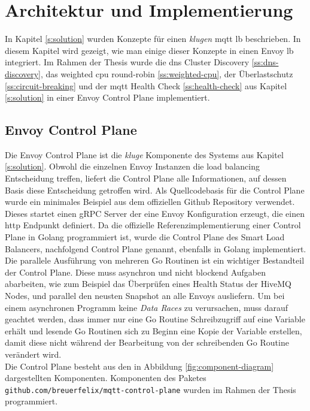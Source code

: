 \section{Architektur und Implementierung}
In Kapitel \ref{s:solution} wurden Konzepte für einen \textit{klugen} \ac{mqtt} \acl{lb} beschrieben. In diesem Kapitel wird gezeigt, wie man einige dieser Konzepte in einen Envoy \acl{lb} integriert.
Im Rahmen der Thesis wurde die \ac{dns} Cluster Discovery \ref{ss:dns-discovery}, das weighted \ac{cpu} round-robin \ref{ss:weighted-cpu}, der Überlastschutz \ref{ss:circuit-breaking} und der \ac{mqtt} Health Check \ref{ss:health-check} aus Kapitel \ref{s:solution} in einer Envoy Control Plane implementiert.

\subsection{Envoy Control Plane} \label{si:control-plane}
Die Envoy Control Plane ist die \textit{kluge} Komponente des Systems aus Kapitel \ref{s:solution}. Obwohl die einzelnen Envoy Instanzen die load balancing Entscheidung treffen, liefert die Control Plane alle Informationen, auf dessen Basis diese Entscheidung getroffen wird.
Als Quellcodebasis für die Control Plane wurde ein minimales Beispiel aus dem offiziellen Github Repository \cite{EnvoyproxyGocontrolplane} verwendet. Dieses startet einen gRPC Server der eine Envoy Konfiguration erzeugt, die einen \ac{http} Endpunkt definiert. Da die offizielle Referenzimplementierung einer Control Plane in Golang programmiert ist, wurde die Control Plane des Smart Load Balancers, nachfolgend Control Plane genannt, ebenfalls in Golang implementiert.
\\
Die parallele Ausführung von mehreren Go Routinen ist ein wichtiger Bestandteil der Control Plane. Diese muss asynchron und nicht blockend Aufgaben abarbeiten, wie zum Beispiel das Überprüfen eines Health Status der HiveMQ Nodes, und parallel den neusten Snapshot an alle Envoys ausliefern.
Um bei einem asynchronen Programm keine \textit{Data Races} zu verursachen, muss darauf geachtet werden, dass immer nur eine Go Routine Schreibzugriff auf eine Variable erhält und lesende Go Routinen sich zu Beginn eine Kopie der Variable erstellen, damit diese nicht während der Bearbeitung von der schreibenden Go Routine verändert wird.
\\
Die Control Plane besteht aus den in Abbildung \ref{fig:component-diagram} dargestellten Komponenten. Komponenten des Paketes \verb|github.com/breuerfelix/mqtt-control-plane| wurden im Rahmen der Thesis programmiert.
